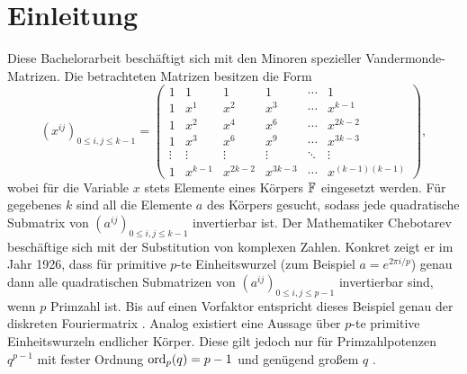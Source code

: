 \section{Einleitung}

Diese Bachelorarbeit beschäftigt sich mit den Minoren spezieller Vandermonde-Matrizen. Die betrachteten Matrizen besitzen die Form \begin{equation*}
    \left( x^{ij} \right)_{0\leq i,j \leq k-1} = \begin{pmatrix}
        1     & 1    & 1    & 1    &\cdots& 1 \\
        1     & x^1  & x^2  & x^3  &\cdots& x^{k-1} \\
        1     & x^2  & x^4  & x^6  &\cdots& x^{2k-2} \\
        1     & x^3  & x^6  & x^9  &\cdots& x^{3k-3} \\
        \vdots&\vdots&\vdots&\vdots&\ddots&\vdots \\
        1     &x^{k-1}&x^{2k-2}&x^{3k-3}&\cdots&x^{(k-1)(k-1)}
    \end{pmatrix},
\end{equation*}
wobei für die Variable $x$ stets Elemente eines Körpers $\field{}$ eingesetzt werden. Für gegebenes $k$ sind all die Elemente $a$ des Körpers gesucht, sodass jede quadratische Submatrix von $\left( a^{ij} \right)_{0\leq i,j \leq k-1}$ invertierbar ist. Der Mathematiker Chebotarev beschäftige sich mit der Substitution von komplexen Zahlen. Konkret zeigt er im Jahr 1926, dass für primitive $p$-te Einheitswurzel (zum Beispiel $a=e^{2\pi i/p}$) genau dann alle quadratischen Submatrizen von $\left( a^{ij} \right)_{0\leq i,j \leq p-1}$ invertierbar sind, wenn $p$ Primzahl ist. Bis auf einen Vorfaktor entspricht dieses Beispiel genau der diskreten Fouriermatrix \cite{CheboProof}. Analog existiert eine Aussage über $p$-te primitive Einheitswurzeln endlicher Körper. Diese gilt jedoch nur für Primzahlpotenzen $q^{p-1}$ mit fester Ordnung $\ord{q}[p] = p-1$ und genügend großem $q$ \cite{CheboFiniteFields}.


